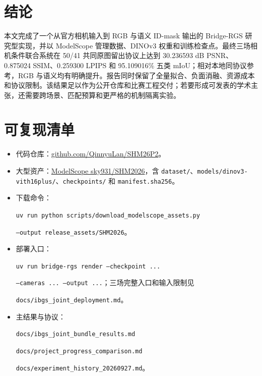 \documentclass[UTF8,a4paper,11pt]{ctexart}
\begin{document}
\section{结论}
本文完成了一个从官方相机输入到 RGB 与语义 ID-mask 输出的 Bridge-RGS 研究型实现，并以 ModelScope 管理数据、DINOv3 权重和训练检查点。最终三场相机条件联合系统在 50/41 共同原图留出协议上达到 30.236593 dB PSNR、0.875024 SSIM、0.259300 LPIPS 和 95.109016\% 五类 mIoU；相对本地同协议参考，RGB 与语义均有明确提升。报告同时保留了全量拟合、负面消融、资源成本和协议限制。该结果足以作为公开仓库和比赛工程交付；若要形成可发表的学术主张，还需要跨场景、匹配预算和更严格的机制隔离实验。

\section*{可复现清单}
\begin{itemize}
  \item 代码仓库：\href{https://github.com/QinnyuLan/SHM26P2}{github.com/QinnyuLan/SHM26P2}。
  \item 大型资产：\href{https://modelscope.cn/datasets/sky931/SHM2026/files}{ModelScope sky931/SHM2026}，含 \texttt{dataset/}、\texttt{models/dinov3-vith16plus/}、\texttt{checkpoints/} 和 \texttt{manifest.sha256}。
  \item 下载命令：\par\texttt{uv run python scripts/download\_modelscope\_assets.py}\par\texttt{--output release\_assets/SHM2026}。
  \item 部署入口：\par\texttt{uv run bridge-rgs render --checkpoint ...}\par\texttt{--cameras ... --output ...}；三场完整入口和输入限制见\par\texttt{docs/ibgs\_joint\_deployment.md}。
  \item 主结果与协议：\par\texttt{docs/ibgs\_joint\_bundle\_results.md}\par\texttt{docs/project\_progress\_comparison.md}\par\texttt{docs/experiment\_history\_20260927.md}。
\end{itemize}



\appendix
\end{document}
